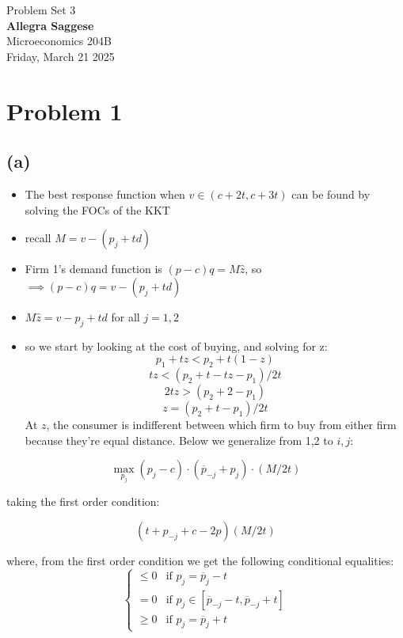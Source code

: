 \documentclass{article}
\begin{document}
\begin{titlepage}
    \centering
    \vspace*{1in} %
    {\Large Problem Set 3} \\[1.5cm] %


    {\Large \textbf{Allegra Saggese}} \\[0.5cm] %
    {\large Microeconomics 204B} \\[1.5cm]

    {\large Friday, March 21 2025} %
    \\[2cm] %

\end{titlepage}

\section{Problem 1}
\subsection*{(a)}

\begin{itemize}
    \item The best response function when $v \in (c+2t, c+3t)$ can be found by solving the FOCs of the KKT
    \item recall $M = v - (p_j + td)$
    \item Firm 1's demand function is $(p-c)q = M \hat{z}$, so $ \implies (p-c)q = v - (p_j + td)$
    \item $M \hat{z} = v - p_j + td$ for all $j = 1, 2$
    \item so we start by looking at the cost of buying, and solving for z: 
    \[
    p_1 + tz < p_2 + t(1-z) 
    \]
    \[
    tz < (p_2 + t - tz - p_1) / 2t
    \]
    \[
    2tz > (p_2 + 2 - p_1)
    \]
    \[
    z = (p_2 + t - p_1)/2t
    \]
    At $z$, the consumer is indifferent between which firm to buy from either firm because they're equal distance. Below we generalize from 1,2 to $i,j$:
\end{itemize}


\[
\max_{p_j} (p_j - c) \cdot (\overline{p}_{-j} +  p_j) \cdot (M/2t)
\]

taking the first order condition: 

\[
(t + p_{-j} + c - 2p)(M/2t)
\]

where, from the first order condition we get the following conditional equalities: 
\[
\left\{
  \begin{array}{ll}
    \leq 0 & \text{if } p_j = \overline{p}_{j} - t\\
    = 0 & \text{if } p_j \in [\overline{p}_{-j} - t, \overline{p}_{-j} +t]\\
    \geq 0 & \text{if } p_j = \overline{p}_{j} + t
    \end{array}
\right.
\]
\end{document}
